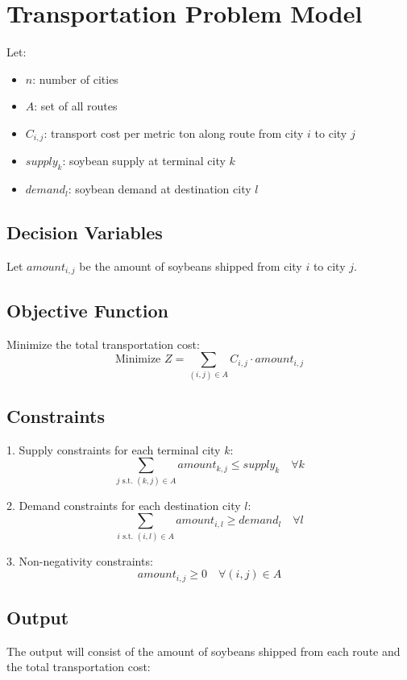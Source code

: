 \documentclass{article}
\begin{document}
\section*{Transportation Problem Model}

Let:
\begin{itemize}
    \item \( n \): number of cities
    \item \( A \): set of all routes
    \item \( C_{i,j} \): transport cost per metric ton along route from city \( i \) to city \( j \)
    \item \( supply_k \): soybean supply at terminal city \( k \)
    \item \( demand_l \): soybean demand at destination city \( l \)
\end{itemize}

\subsection*{Decision Variables}
Let \( amount_{i,j} \) be the amount of soybeans shipped from city \( i \) to city \( j \).

\subsection*{Objective Function}
Minimize the total transportation cost:
\[
\text{Minimize } Z = \sum_{(i,j) \in A} C_{i,j} \cdot amount_{i,j}
\]

\subsection*{Constraints}
1. Supply constraints for each terminal city \( k \):
\[
\sum_{j \text{ s.t. } (k,j) \in A} amount_{k,j} \leq supply_k \quad \forall k
\]

2. Demand constraints for each destination city \( l \):
\[
\sum_{i \text{ s.t. } (i,l) \in A} amount_{i,l} \geq demand_l \quad \forall l
\]

3. Non-negativity constraints:
\[
amount_{i,j} \geq 0 \quad \forall (i,j) \in A
\]

\subsection*{Output}
The output will consist of the amount of soybeans shipped from each route and the total transportation cost:
\end{document}
